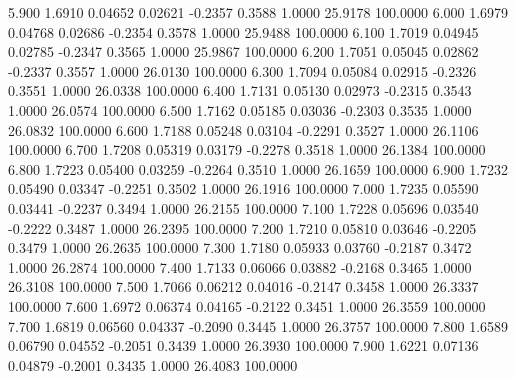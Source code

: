    5.900   1.6910   0.04652   0.02621  -0.2357   0.3588   1.0000  25.9178 100.0000
   6.000   1.6979   0.04768   0.02686  -0.2354   0.3578   1.0000  25.9488 100.0000
   6.100   1.7019   0.04945   0.02785  -0.2347   0.3565   1.0000  25.9867 100.0000
   6.200   1.7051   0.05045   0.02862  -0.2337   0.3557   1.0000  26.0130 100.0000
   6.300   1.7094   0.05084   0.02915  -0.2326   0.3551   1.0000  26.0338 100.0000
   6.400   1.7131   0.05130   0.02973  -0.2315   0.3543   1.0000  26.0574 100.0000
   6.500   1.7162   0.05185   0.03036  -0.2303   0.3535   1.0000  26.0832 100.0000
   6.600   1.7188   0.05248   0.03104  -0.2291   0.3527   1.0000  26.1106 100.0000
   6.700   1.7208   0.05319   0.03179  -0.2278   0.3518   1.0000  26.1384 100.0000
   6.800   1.7223   0.05400   0.03259  -0.2264   0.3510   1.0000  26.1659 100.0000
   6.900   1.7232   0.05490   0.03347  -0.2251   0.3502   1.0000  26.1916 100.0000
   7.000   1.7235   0.05590   0.03441  -0.2237   0.3494   1.0000  26.2155 100.0000
   7.100   1.7228   0.05696   0.03540  -0.2222   0.3487   1.0000  26.2395 100.0000
   7.200   1.7210   0.05810   0.03646  -0.2205   0.3479   1.0000  26.2635 100.0000
   7.300   1.7180   0.05933   0.03760  -0.2187   0.3472   1.0000  26.2874 100.0000
   7.400   1.7133   0.06066   0.03882  -0.2168   0.3465   1.0000  26.3108 100.0000
   7.500   1.7066   0.06212   0.04016  -0.2147   0.3458   1.0000  26.3337 100.0000
   7.600   1.6972   0.06374   0.04165  -0.2122   0.3451   1.0000  26.3559 100.0000
   7.700   1.6819   0.06560   0.04337  -0.2090   0.3445   1.0000  26.3757 100.0000
   7.800   1.6589   0.06790   0.04552  -0.2051   0.3439   1.0000  26.3930 100.0000
   7.900   1.6221   0.07136   0.04879  -0.2001   0.3435   1.0000  26.4083 100.0000
